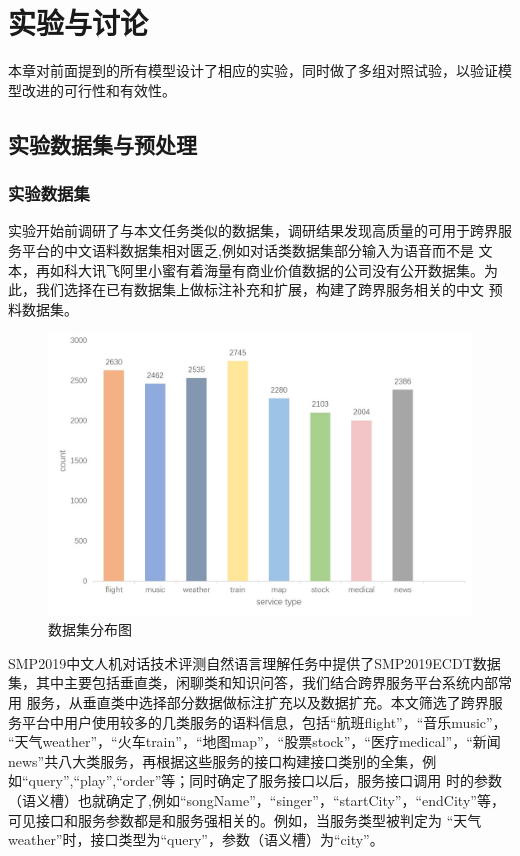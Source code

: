 \chapter{实验与讨论}
本章对前面提到的所有模型设计了相应的实验，同时做了多组对照试验，以验证模型改进的可行性和有效性。

\section{实验数据集与预处理}
\subsection{实验数据集}
实验开始前调研了与本文任务类似的数据集，调研结果发现高质量的可用于跨界服务平台的中文语料数据集相对匮乏,例如对话类数据集部分输入为语音而不是
文本，再如科大讯飞阿里小蜜有着海量有商业价值数据的公司没有公开数据集。为此，我们选择在已有数据集上做标注补充和扩展，构建了跨界服务相关的中文
预料数据集。

\begin{figure}[htbp]
    \centering
    \includegraphics[width=15cm]{./images/count.jpg}
    \caption{数据集分布图}
    \label{fig:count}
  \end{figure}

SMP2019中文人机对话技术评测自然语言理解任务中提供了SMP2019ECDT数据集，其中主要包括垂直类，闲聊类和知识问答，我们结合跨界服务平台系统内部常用
服务，从垂直类中选择部分数据做标注扩充以及数据扩充。本文筛选了跨界服务平台中用户使用较多的几类服务的语料信息，包括“航班flight”，“音乐music”，
“天气weather”，“火车train”，“地图map”，“股票stock”，“医疗medical”，“新闻news”共八大类服务，再根据这些服务的接口构建接口类别的全集，例如“query”,“play”,“order”等；同时确定了服务接口以后，服务接口调用
时的参数（语义槽）也就确定了,例如“songName”，“singer”，“startCity”，“endCity”等，可见接口和服务参数都是和服务强相关的。例如，当服务类型被判定为
“天气weather”时，接口类型为“query”，参数（语义槽）为“city”。

